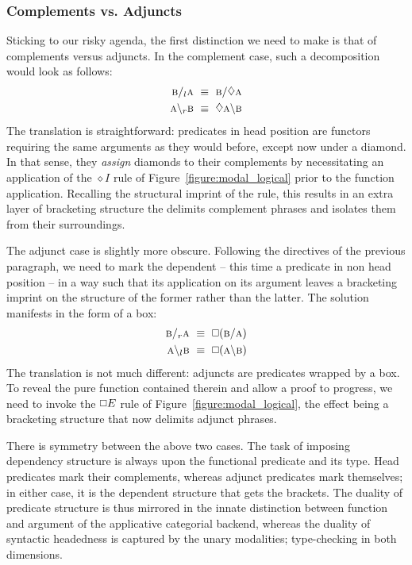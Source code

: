 \subsubsection{Complements vs. Adjuncts}
Sticking to our risky agenda, the first distinction we need to make is that of complements versus adjuncts.
In the complement case, such a decomposition would look as follows:
\begin{align}
	\prop{b} \divright_l \prop{a} \ \equiv \ \prop{b} \divright \diamond \prop{a} \\
	\prop{a} \divleft_r \prop{b} \ \equiv \ \diamond  \prop{a} \divleft \prop{b}
\end{align}
The translation is straightforward: predicates in head position are functors requiring the same arguments as they would before, except now under a diamond.
In that sense, they \textit{assign} diamonds to their complements by necessitating an application of the $\diamond I$ rule of Figure~\ref{figure:modal_logical} prior to the function application.
Recalling the structural imprint of the rule, this results in an extra layer of bracketing structure the delimits complement phrases and isolates them from their surroundings.

The adjunct case is slightly more obscure.
Following the directives of the previous paragraph, we need to mark the dependent -- this time a predicate in non head position -- in a way such that its application on its argument leaves a bracketing imprint on the structure of the former rather than the latter.
The solution manifests in the form of a box:
\begin{align}
	\prop{b} \divright_r \prop{a} \ \equiv \ \bx (\prop{b} \divright \prop{a}) \\
	\prop{a} \divleft_l \prop{b} \ \equiv \ \bx (\prop{a} \divleft \prop{b})
\end{align}
The translation is not much different: adjuncts are predicates wrapped by a box.
To reveal the pure function contained therein and allow a proof to progress, we need to invoke the $\bx E$ rule of Figure~\ref{figure:modal_logical}, the effect being a bracketing structure that now delimits adjunct phrases.

There is symmetry between the above two cases.
The task of imposing dependency structure is always upon the functional predicate and its type.
Head predicates mark their complements, whereas adjunct predicates mark themselves; in either case, it is the dependent structure that gets the brackets.
The duality of predicate structure is thus mirrored in the innate distinction between function and argument of the applicative categorial backend, whereas the duality of syntactic headedness is captured by the unary modalities; type-checking in both dimensions.


